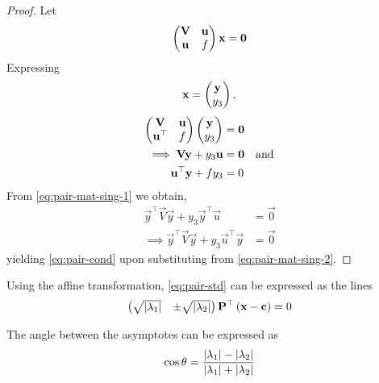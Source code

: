 \documentclass[journal,12pt,onecolumn]{IEEEtran}
\begin{document}
  \begin{proof}
Let 
  \begin{align} 
	  \begin{pmatrix}\mathbf{V} & \mathbf{u}\\ \mathbf{u} & f\end{pmatrix}  \mathbf{x} =\mathbf{0}
  \end{align} 
  Expressing 
  \begin{align} 
	  \mathbf{x} =\begin{pmatrix}\mathbf{y} \\ y_3\end{pmatrix}, 
  \end{align} 
  \begin{align} 
	  \begin{pmatrix}\mathbf{V} & \mathbf{u}\\ \mathbf{u}^{\top} & f\end{pmatrix}   
	  \begin{pmatrix}\mathbf{y} \\ y_3\end{pmatrix} &= \mathbf{0}
	  \\
	  \implies
	  \label{eq:pair-mat-sing-1}
	  \mathbf{V} \mathbf{y} + y_3\mathbf{u} &= \mathbf{0} \quad \text{and}
	  \\
	  \mathbf{u}^{\top}\mathbf{y} + fy_3 &=0
	  \label{eq:pair-mat-sing-2}
  \end{align} 
  From 
	  \eqref{eq:pair-mat-sing-1} we obtain,
  \begin{align} 
	  \vec{y}^{\top}  \vec{V} \vec{y} + y_3\vec{y}^{\top}\vec{u} &= \vec{0} 
	  \\
	  \implies 
	  \vec{y}^{\top}  \vec{V} \vec{y} + y_3\vec{u}^{\top}\vec{y} &= \vec{0} 
  \end{align} 
  yielding 
	  \eqref{eq:pair-cond} upon substituting from 
	  \eqref{eq:pair-mat-sing-2}.
  \end{proof}
  \begin{corollary}
	  Using the affine transformation, 
    \eqref{eq:pair-std}
 can be expressed as the lines 
%
\begin{align} 
\label{eq:quad_form_pair}
\begin{pmatrix}\sqrt{\left\vert\lambda_1\right\vert} & \pm \sqrt{\left\vert\lambda_2\right\vert}\end{pmatrix}\mathbf{P}^{\top}\left(\mathbf{x}-\mathbf{c}\right) = 0
\end{align} 
  \end{corollary}
   \begin{corollary}
	   The angle between the asymptotes can be expressed as
\begin{align} 
\label{eq:quad_form_pair_ang}
\cos\theta=\frac{\left\vert\lambda_1\right\vert-\left\vert\lambda_2\right\vert}
{\left\vert\lambda_1\right\vert+\left\vert\lambda_2\right\vert}
\end{align} 
  \end{corollary}
\end{document}
